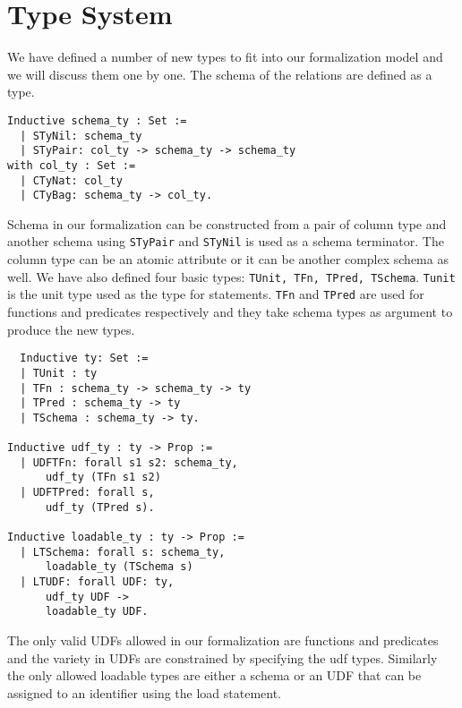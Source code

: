 \section{Type System}
\label{sec:types}

We have defined a number of new types to fit into our formalization model and we will discuss them one by one. The schema of the relations are defined as a type.

\begin{lstlisting}
Inductive schema_ty : Set :=
  | STyNil: schema_ty
  | STyPair: col_ty -> schema_ty -> schema_ty
with col_ty : Set :=
  | CTyNat: col_ty
  | CTyBag: schema_ty -> col_ty.
\end{lstlisting}

Schema in our formalization can be constructed from a pair of column type and another schema using \texttt{STyPair} and \texttt{STyNil} is used as a schema terminator. The column type can be an atomic attribute or it can be another complex schema as well. We have also defined four basic types: \texttt{TUnit, TFn, TPred, TSchema}. \texttt{Tunit} is the unit type used as the type for statements. \texttt{TFn} and \texttt{TPred} are used for functions and predicates respectively and they take schema types as argument to produce the new types.

\begin{lstlisting}
  Inductive ty: Set :=
  | TUnit : ty
  | TFn : schema_ty -> schema_ty -> ty
  | TPred : schema_ty -> ty
  | TSchema : schema_ty -> ty.

Inductive udf_ty : ty -> Prop :=
  | UDFTFn: forall s1 s2: schema_ty,
      udf_ty (TFn s1 s2)
  | UDFTPred: forall s,
      udf_ty (TPred s).

Inductive loadable_ty : ty -> Prop :=
  | LTSchema: forall s: schema_ty,
      loadable_ty (TSchema s)
  | LTUDF: forall UDF: ty,
      udf_ty UDF ->
      loadable_ty UDF.
\end{lstlisting}

The only valid UDFs allowed in our formalization are functions and predicates and the variety in UDFs are constrained by specifying the udf types. Similarly the only allowed loadable types are either a schema or an UDF that can be assigned to an identifier using the load statement.

